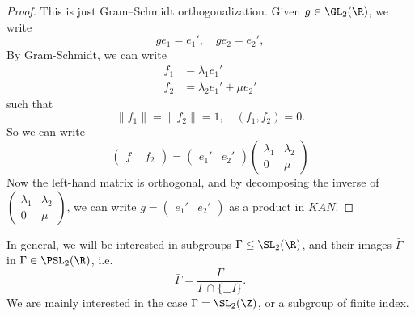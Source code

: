 \documentclass[a4paper]{article}
\begin{document}
\begin{proof}
  This is just Gram--Schmidt orthogonalization. Given $g \in \GL_2(\R)$, we write
  \[
    g e_1 = e_1',\quad g e_2 = e_2',
  \]
  By Gram-Schmidt, we can write
  \begin{align*}
    f_1 &= \lambda_1 e_1'\\
    f_2 &= \lambda_2 e_1' + \mu e_2'
  \end{align*}
  such that
  \[
    \|f_1\| = \|f_2\| = 1,\quad (f_1, f_2) = 0.
  \]
  So we can write
  \[
    \begin{pmatrix}
      f_1 & f_2
    \end{pmatrix} =
    \begin{pmatrix}
      e_1' & e_2'
    \end{pmatrix}
    \begin{pmatrix}
      \lambda_1 & \lambda_2\\
      0 & \mu
    \end{pmatrix}
  \]
  Now the left-hand matrix is orthogonal, and by decomposing the inverse of $\begin{pmatrix} \lambda_1 & \lambda_2\\0 & \mu\end{pmatrix}$, we can write $g = \begin{pmatrix}e_1' & e_2'\end{pmatrix}$ as a product in $KAN$.
\end{proof}
In general, we will be interested in subgroups $\Gamma \leq\SL_2(\R)$, and their images $\bar\Gamma$ in $\Gamma \in \PSL_2(\R)$, i.e.
\[
  \bar\Gamma = \frac{\Gamma}{\Gamma \cap \{\pm I\}}.
\]
We are mainly interested in the case $\Gamma = \SL_2(\Z)$, or a subgroup of finite index.
\end{document}
